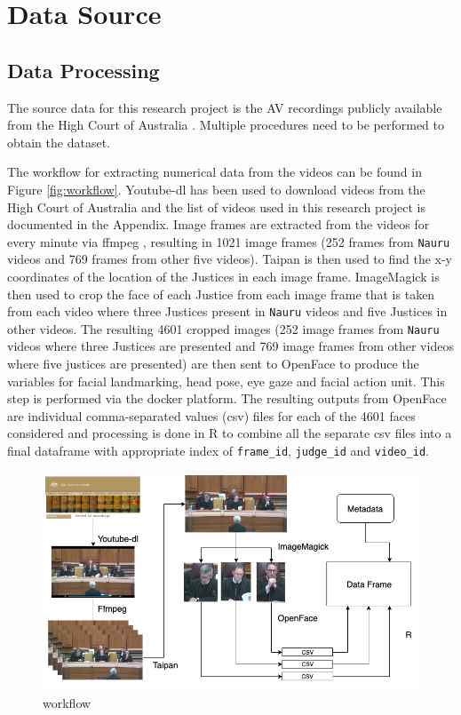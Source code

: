 \documentclass{monashthesis}
\begin{document}
\hypertarget{data-source}{%
\chapter{Data Source}\label{data-source}}

\hypertarget{data-processing}{%
\section{Data Processing}\label{data-processing}}

The source data for this research project is the AV recordings publicly available from the High Court of Australia \autocite{highcourtau}. Multiple procedures need to be performed to obtain the dataset.

The workflow for extracting numerical data from the videos can be found in Figure \ref{fig:workflow}. Youtube-dl \autocite{youtube-dl} has been used to download videos from the High Court of Australia\autocite{highcourtau} and the list of videos used in this research project is documented in the Appendix. Image frames are extracted from the videos for every minute via ffmpeg \autocite{ffmpeg}, resulting in 1021 image frames (252 frames from \texttt{Nauru} videos and 769 frames from other five videos). Taipan \autocite{Taipan} is then used to find the x-y coordinates of the location of the Justices in each image frame. ImageMagick \autocite{ImageMagick} is then used to crop the face of each Justice from each image frame that is taken from each video where three Justices present in \texttt{Nauru} videos and five Justices in other videos. The resulting 4601 cropped images (252 image frames from \texttt{Nauru} videos where three Justices are presented and 769 image frames from other videos where five justices are presented) are then sent to OpenFace \autocite{baltrusaitis2018openface} to produce the variables for facial landmarking, head pose, eye gaze and facial action unit. This step is performed via the docker platform. The resulting outputs from OpenFace are individual comma-separated values (csv) files for each of the 4601 faces considered and processing is done in R to combine all the separate csv files into a final dataframe with appropriate index of \texttt{frame\_id}, \texttt{judge\_id} and \texttt{video\_id}.

\begin{figure}
\includegraphics[width=6.2in]{figures/workflow} \caption{workflow \label{fig:workflow}}\label{fig:unnamed-chunk-1}
\end{figure}
\end{document}
